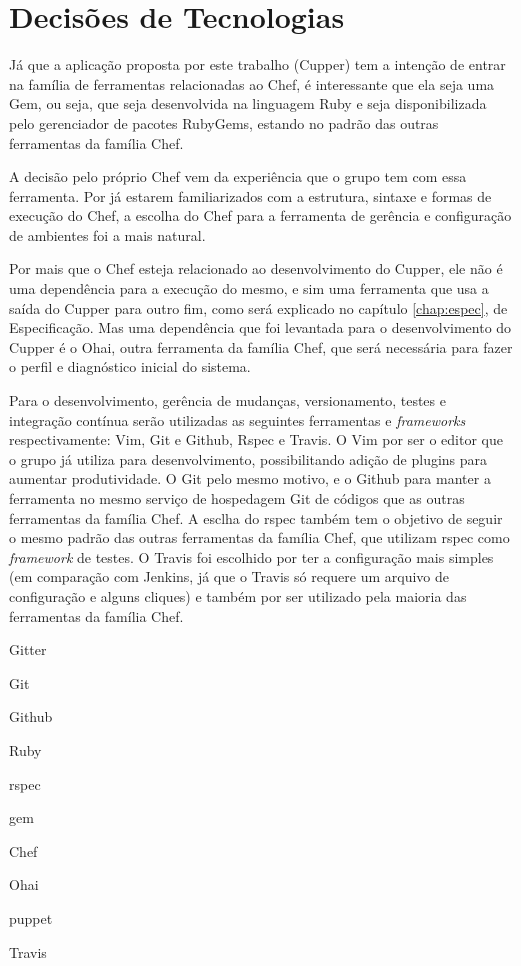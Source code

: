 \section{Decisões de Tecnologias}
\label{sec:tec}
Já que a aplicação proposta por este trabalho (Cupper) tem a intenção de entrar
na família de ferramentas relacionadas ao Chef, é interessante que ela seja uma
Gem, ou seja, que seja desenvolvida na linguagem Ruby e seja disponibilizada pelo
gerenciador de pacotes RubyGems, estando no padrão das outras ferramentas da
família Chef.

A decisão pelo próprio Chef vem da experiência que o grupo tem com essa ferramenta.
Por já estarem familiarizados com a estrutura, sintaxe e formas de execução do Chef,
a escolha do Chef para a ferramenta de gerência e configuração de ambientes foi a
mais natural.

Por mais que o Chef esteja relacionado ao desenvolvimento do Cupper, ele não é uma
dependência para a execução do mesmo, e sim uma ferramenta que usa a saída do Cupper
para outro fim, como será explicado no capítulo \ref{chap:espec}, de Especificação.
Mas uma dependência que foi levantada para o desenvolvimento do Cupper é o Ohai,
outra ferramenta da família Chef, que será necessária para fazer o perfil e diagnóstico
inicial do sistema.

Para o desenvolvimento, gerência de mudanças, versionamento, testes e integração
contínua serão utilizadas as seguintes ferramentas e \textit{frameworks} respectivamente:
Vim, Git e Github, Rspec e Travis. O Vim por ser o editor que o grupo já utiliza para
desenvolvimento, possibilitando adição de plugins para aumentar produtividade. O Git
pelo mesmo motivo, e o Github para manter a ferramenta no mesmo serviço de hospedagem
Git de códigos que as outras ferramentas da família Chef. A esclha do rspec também
tem o objetivo de seguir o mesmo padrão das outras ferramentas da família Chef, que
utilizam rspec como \textit{framework} de testes. O Travis foi escolhido por ter a
configuração mais simples (em comparação com Jenkins, já que o Travis só requere
um arquivo de configuração e alguns cliques) e também por ser utilizado pela
maioria das ferramentas da família Chef.




Gitter

Git

Github

Ruby

rspec

gem

Chef

Ohai

puppet

Travis

